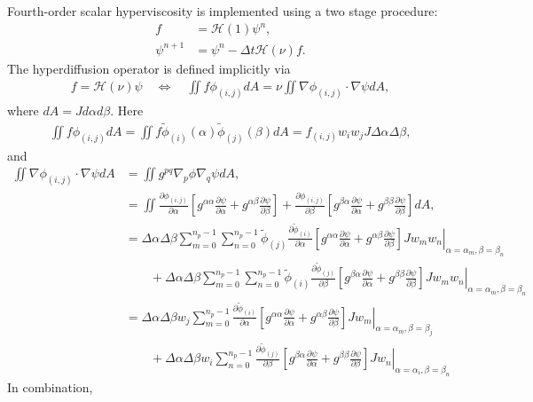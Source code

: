 \documentclass{article}
\newcommand{\pdiff}[2]{\frac{\partial #1}{\partial #2}}
\begin{document}
Fourth-order scalar hyperviscosity is implemented using a two stage procedure:
\begin{align}
f &= \mathcal{H}(1) \psi^n, \\
\psi^{n+1} &= \psi^n - \Delta t \mathcal{H}(\nu) f.
\end{align}  The hyperdiffusion operator is defined implicitly via
\begin{align}
f = \mathcal{H}(\nu) \psi \quad \Longleftrightarrow \quad \iint f \phi_{(i,j)} dA = \nu \iint \nabla \phi_{(i,j)} \cdot \nabla \psi dA,
\end{align} where $dA = J d\alpha d\beta$.  Here
\begin{align}
\iint f \phi_{(i,j)} dA = \iint f \tilde{\phi}_{(i)}(\alpha) \tilde{\phi}_{(j)}(\beta) dA = f_{(i,j)} w_i w_j J \Delta \alpha \Delta \beta,
\end{align} and
\begin{align}
\iint \nabla \phi_{(i,j)} \cdot \nabla \psi dA &= \iint g^{pq} \nabla_p \phi \nabla_q \psi dA, \\
&= \iint \pdiff{\phi_{(i,j)}}{\alpha} \left[ g^{\alpha \alpha} \pdiff{\psi}{\alpha} + g^{\alpha \beta} \pdiff{\psi}{\beta} \right] + \pdiff{\phi_{(i,j)}}{\beta} \left[ g^{\beta \alpha} \pdiff{\psi}{\alpha} + g^{\beta \beta} \pdiff{\psi}{\beta} \right] dA, \\
&= \Delta \alpha \Delta \beta \sum_{m=0}^{n_p-1} \sum_{n=0}^{n_p-1} \tilde{\phi}_{(j)} \pdiff{\tilde{\phi}_{(i)}}{\alpha} \left. \left[ g^{\alpha \alpha} \pdiff{\psi}{\alpha} + g^{\alpha \beta} \pdiff{\psi}{\beta} \right] J w_m w_n \right\vert_{\alpha = \alpha_m, \beta = \beta_n} \nonumber \\
& \qquad + \Delta \alpha \Delta \beta \sum_{m=0}^{n_p-1} \sum_{n=0}^{n_p-1} \tilde{\phi}_{(i)} \pdiff{\tilde{\phi}_{(j)}}{\beta} \left. \left[ g^{\beta \alpha} \pdiff{\psi}{\alpha} + g^{\beta \beta} \pdiff{\psi}{\beta} \right] J w_m w_n \right\vert_{\alpha = \alpha_m, \beta = \beta_n} \\
&= \Delta \alpha \Delta \beta w_j \sum_{m=0}^{n_p-1} \pdiff{\tilde{\phi}_{(i)}}{\alpha} \left. \left[ g^{\alpha \alpha} \pdiff{\psi}{\alpha} + g^{\alpha \beta} \pdiff{\psi}{\beta} \right] J w_m \right\vert_{\alpha = \alpha_m, \beta = \beta_j} \nonumber \\
& \qquad + \Delta \alpha \Delta \beta w_i \sum_{n=0}^{n_p-1} \pdiff{\tilde{\phi}_{(j)}}{\beta} \left. \left[ g^{\beta \alpha} \pdiff{\psi}{\alpha} + g^{\beta \beta} \pdiff{\psi}{\beta} \right] J w_n \right\vert_{\alpha = \alpha_i, \beta = \beta_n}
\end{align}  In combination,
\end{document}
